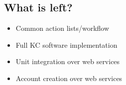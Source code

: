 \documentclass[12pt,notitlepage]{article}
\begin{document}
\begin{s5presentation}
%
%
  \W \begin{s5slide}
    \section{What is left?}
    \begin{itemize}
      \item Common action lists/workflow
      \item Full KC software implementation
      \item Unit integration over web services
      \item Account creation over web services
    \end{itemize}
  \W \end{s5slide}
  
  \W \end{s5presentation}
\end{document}

